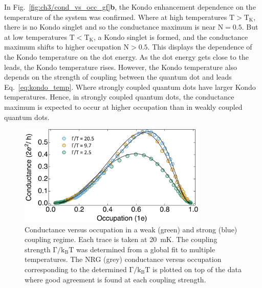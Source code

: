 In Fig.~\ref{fig:ch3/cond_vs_occ_gf}\textbf{b}, the Kondo enhancement dependence on the temperature of the system was confirmed. Where at high temperatures $\mathrm{T>T_K}$, there is no Kondo singlet and so the conductance maximum is near $\mathrm{N} = 0.5$. But at low temperatures $\mathrm{T<T_K}$, a Kondo singlet is formed, and the conductance maximum shifts to higher occupation $\mathrm{N} > 0.5$. This displays the dependence of the Kondo temperature on the dot energy. As the dot energy gets close to the leads, the Kondo temperature rises. However, the Kondo temperature also depends on the strength of coupling between the quantum dot and leads Eq.~\ref{eq:kondo_temp}. Where strongly coupled quantum dots have larger Kondo temperatures. Hence, in strongly coupled quantum dots, the conductance maximum is expected to occur at higher occupation than in weakly coupled quantum dots. 


\begin{figure}[!bht]
 \begin{center}
 \includegraphics[width=0.8\textwidth]{figures/ch3/crop_FiguresMaster.015.png}
 \caption[Conductance vs. Occupation : Varying the coupling strength between the quantum dot and leads]{\label{fig:ch3/cond_occ_couplingstrength} 
 Conductance versus occupation in a weak (green) and strong (blue) coupling regime. Each trace is taken at \qty{20}{mK}. The coupling strength $\mathrm{\Gamma/k_BT}$ was determined from a global fit to multiple temperatures. The NRG (grey) conductance versus occupation corresponding to the determined $\mathrm{\Gamma/k_BT}$ is plotted on top of the data where good agreement is found at each coupling strength.}
 \end{center}
\end{figure}


